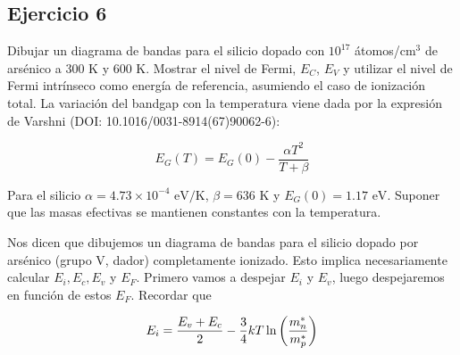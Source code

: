 \begin{Enunciado}
\subsection*{Ejercicio 6}

Dibujar un diagrama de bandas para el silicio dopado con $10^{17}$ átomos/cm$^3$ de arsénico a 300 K y 600 K. Mostrar el nivel de Fermi, $E_C$, $E_V$ y utilizar el nivel de Fermi intrínseco como energía de referencia, asumiendo el caso de ionización total. La variación del bandgap con la temperatura viene dada por la expresión de Varshni (DOI: 10.1016/0031-8914(67)90062-6):

\begin{equation}
	E_G(T) = E_G(0) - \frac{\alpha T^2}{T + \beta}
\end{equation}

Para el silicio $\alpha = 4.73 \times 10^{-4} \text{ eV/K}$, $\beta = 636 \text{ K}$ y $E_G(0) = 1.17 \text{ eV}$. Suponer que las masas efectivas se mantienen constantes con la temperatura.

\end{Enunciado}


Nos dicen que dibujemos un diagrama de bandas para el silicio dopado por arsénico (grupo V, dador) completamente ionizado. Esto implica necesariamente calcular $E_i,E_c,E_v$ y $E_F$. Primero vamos a despejar $E_i$ y $E_v$, luego despejaremos en función de estos $E_F$. Recordar que

\begin{equation}
	E_i = \frac{E_v+E_c}{2} - \frac{3}{4} kT \ln\left( \frac{m_n^*}{m_p^*} \right)
\end{equation}

